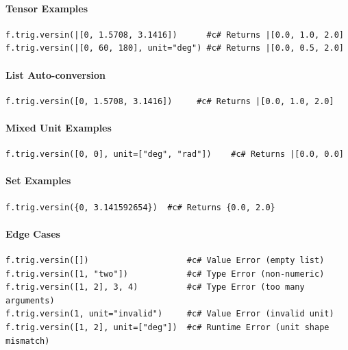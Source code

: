 \paragraph{Tensor Examples}
\begin{verbatim}
f.trig.versin(|[0, 1.5708, 3.1416])      #c# Returns |[0.0, 1.0, 2.0]
f.trig.versin(|[0, 60, 180], unit="deg") #c# Returns |[0.0, 0.5, 2.0]
\end{verbatim}

\paragraph{List Auto-conversion}
\begin{verbatim}
f.trig.versin([0, 1.5708, 3.1416])     #c# Returns |[0.0, 1.0, 2.0]
\end{verbatim}

\paragraph{Mixed Unit Examples}
\begin{verbatim}
f.trig.versin([0, 0], unit=["deg", "rad"])    #c# Returns |[0.0, 0.0]
\end{verbatim}

\paragraph{Set Examples}
\begin{verbatim}
f.trig.versin({0, 3.141592654})  #c# Returns {0.0, 2.0}
\end{verbatim}

\paragraph{Edge Cases}
\begin{verbatim}
f.trig.versin([])                    #c# Value Error (empty list)
f.trig.versin([1, "two"])            #c# Type Error (non-numeric)
f.trig.versin([1, 2], 3, 4)          #c# Type Error (too many arguments)
f.trig.versin(1, unit="invalid")     #c# Value Error (invalid unit)
f.trig.versin([1, 2], unit=["deg"])  #c# Runtime Error (unit shape mismatch)
\end{verbatim}

